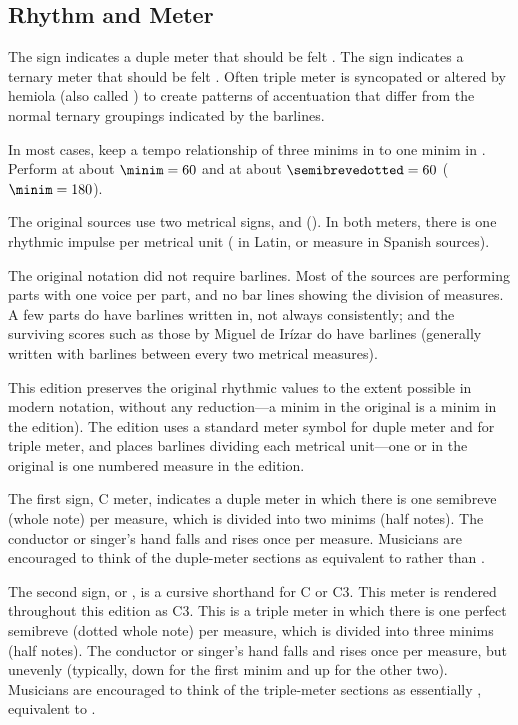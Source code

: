\subsection*{Rhythm and Meter}

\begin{epitome}
    The sign \meterC{} indicates a duple meter that should be felt .
    The sign \meterCThree{} indicates a ternary meter that should be felt
    .
    Often triple meter is syncopated or altered by hemiola (also called
    ) to create patterns of accentuation that differ from the
    normal ternary groupings indicated by the barlines.

    In most cases, keep a tempo relationship of three minims in \meterCThree{}
    to one minim in \meterC{}.
    Perform \meterC{} at about $\minim = 60$ and \meterCThree{} at about
    $\semibrevedotted = 60$ ($\minim = 180$).
\end{epitome}


The original sources use two metrical signs, \meterC{} and \meterCZorig{}
(\meterCZ).
In both meters, there is one rhythmic impulse per metrical unit
( in Latin,  or measure in Spanish sources).

The original notation did not require barlines.
Most of the sources are performing parts with one voice per part, and no bar
lines showing the division of measures.
A few parts do have barlines written in, not always consistently; and the
surviving scores such as those by Miguel de Irízar do have barlines
(generally written with barlines between every two metrical measures).

This edition preserves the original rhythmic values to the extent possible
in modern notation, without any reduction---a minim in the original is a
minim in the edition).
The edition uses a standard \meterC{} meter symbol for duple meter and
\meterCThree{} for triple meter, and places barlines dividing each metrical
unit---one  or  in the original is one numbered
measure in the edition.

The first sign, C meter, indicates a duple meter in which there is one semibreve
(whole note) per measure, which is divided into two minims (half notes).
The conductor or singer's hand falls and rises once per measure.
Musicians are encouraged to think of the duple-meter sections as equivalent
to  rather than .

The second sign, \meterCZorig{} or \meterCZ, is a cursive shorthand for
C or C3. 
This meter is rendered throughout this edition as C3.
This is a triple meter in which there is one perfect semibreve (dotted whole
note) per measure, which is divided into three minims (half notes).
The conductor or singer's hand falls and rises once per measure, but
unevenly (typically, down for the first minim and up for the other two).
Musicians are encouraged to think of the triple-meter sections as
essentially , equivalent to .

